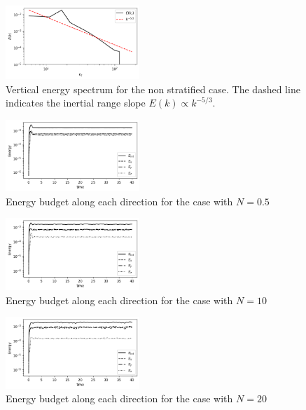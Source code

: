 \documentclass[final,5p,times,twocolumn,authoryear]{elsarticle}
\begin{document}
\begin{figure}[h]
	\centering
	\includegraphics[width=0.45\textwidth]{fig/iso_Ekz_kz.png}
	\caption{Vertical energy spectrum for the non stratified case. The dashed line indicates the inertial range slope $E(k) \propto k^{-5/3}$. } 
	\label{fig:iso vertical spectrum}
\end{figure}

\begin{figure}[h]
	\centering
	\includegraphics[width=0.45\textwidth]{fig/0.5_budget.png}
	\caption{Energy budget along each direction for the case with $N=0.5$} 
	\label{fig:0.5 budget}
\end{figure}

\begin{figure}[h]
	\centering
	\includegraphics[width=0.45\textwidth]{fig/10_budget.png}
	\caption{Energy budget along each direction for the case with $N=10$} 
	\label{fig:10 budget}
\end{figure}

\begin{figure}[h]
	\centering
	\includegraphics[width=0.45\textwidth]{fig/20_budget.png}
	\caption{Energy budget along each direction for the case with $N=20$} 
	\label{fig:20 budget}
\end{figure}
\end{document}
